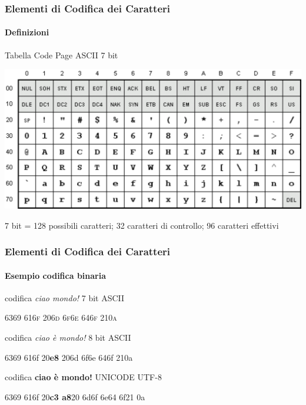 \begin{frame}
	\frametitle{Elementi di Codifica dei Caratteri}
	\framesubtitle{Definizioni}
	\addtocounter{nframe}{1}

	\begin{block}{Tabella Code Page ASCII 7 bit}
		\begin{center}
			\includegraphics[width=.9\textwidth]{imgs/ascii-67.pdf}
		\end{center}

	\end{block}
	\begin{tiny}
		\begin{center}
			7 bit = 128 possibili caratteri; 32 caratteri di controllo; 96 caratteri effettivi
		\end{center}

	\end{tiny}

\end{frame}

\begin{frame}
	\frametitle{Elementi di Codifica dei Caratteri}
	\framesubtitle{Esempio codifica binaria}
	\addtocounter{nframe}{1}

	\begin{block}{codifica \textit{ciao mondo!} 7 bit ASCII}
		\begin{center}
			\textsc{6369 616f 206d 6f6e 646f 210a}
		\end{center}
	\end{block}

	\begin{block}{codifica \textit{ciao è mondo!} 8 bit ASCII}
		\begin{center}
			\textmd{6369 616f 20\textbf{e8} 206d 6f6e 646f 210a       }
		\end{center}
	\end{block}

	\begin{block}{codifica \textbf{ciao è mondo!} UNICODE UTF-8}
		\begin{center}
			6369 616f 20\textbf{c3 a8}20 6d6f 6e64 6f21 0a
		\end{center}
	\end{block}

\end{frame}


